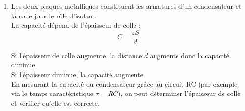 \documentclass[a4paper,11pt,fleqn]{scrartcl}
\begin{document}
\begin{enumerate}[resume]
    \item Les deux plaques métalliques constituent les armatures d'un condensateur et la colle joue le rôle d'isolant.\\

    La capacité dépend de l'épaisseur de colle :
    \[
    C=\dfrac{\varepsilon S}{d}
    \]

    Si l'épaisseur de colle augmente, la distance $d$ augmente donc la capacité diminue.\\
    Si l'épaisseur diminue, la capacité augmente.\\

    En mesurant la capacité du condensateur grâce au circuit RC (par exemple via le temps caractéristique $\tau=RC$), on peut déterminer l'épaisseur de colle et vérifier qu'elle est correcte.
\end{enumerate}
\end{document}
